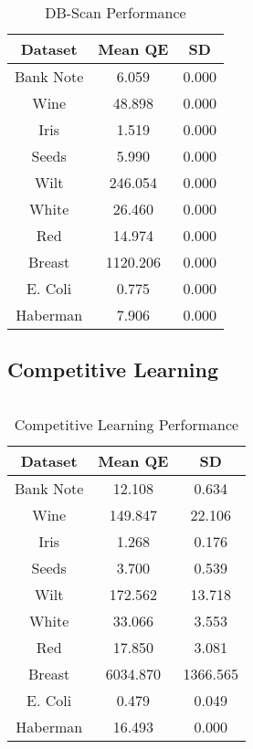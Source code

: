 \documentclass[conference]{IEEEtran}
\begin{document}
  \begin{table}[h]
  \caption{DB-Scan Performance}
  \resizebox{1.3\textwidth}{!} {\begin{minipage}{\textwidth}
      
      \begin{tabular}{ c |c | c }
        Dataset & Mean QE & SD \\ \hline
        Bank Note & 6.059 & 0.000 \\
        Wine & 48.898 & 0.000 \\
        Iris & 1.519 & 0.000 \\
        Seeds & 5.990 & 0.000 \\
        Wilt & 	246.054 & 0.000 \\
        White &	26.460 & 0.000 \\
        Red & 14.974 & 0.000 \\
        Breast & 1120.206 & 0.000 \\
        E. Coli & 0.775 & 0.000 \\
        Haberman & 7.906 & 0.000 \\
      \end{tabular}

      \label{table:dbError}
  \end{minipage} }
  \end{table}

  \subsection{Competitive Learning}
$\;$
  \begin{table}[h]
  \caption{Competitive Learning Performance}
  \resizebox{1.3\textwidth}{!} {\begin{minipage}{\textwidth}
      
      \begin{tabular}{ c |c | c }
        Dataset & Mean QE & SD \\ \hline
        Bank Note & 12.108 & 0.634 \\
        Wine & 149.847 & 22.106 \\
        Iris & 1.268 & 0.176 \\
        Seeds & 3.700 & 0.539 \\
        Wilt & 172.562 & 13.718 \\
        White & 33.066 & 3.553 \\
        Red & 17.850 & 3.081 \\
        Breast & 6034.870 & 1366.565 \\
        E. Coli & 0.479 & 0.049 \\
        Haberman & 16.493 & 0.000
      \end{tabular}

      \label{table:clError}
  \end{minipage} }
  \end{table}
  
\end{document}
